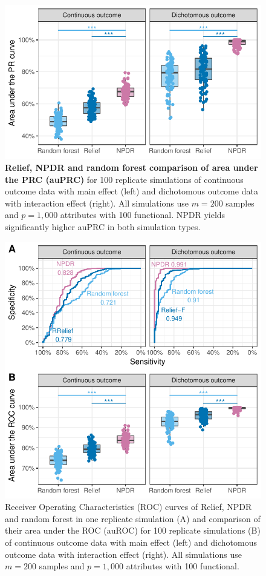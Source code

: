 \documentclass{article}
\begin{document}
\begin{figure}[h]%
\centerline{\includegraphics[]{../figs/pr_compare_100.pdf}}
\caption{\textbf{Relief, NPDR and random forest comparison of area under the PRC (auPRC)} for 100 replicate simulations of continuous outcome data with main effect (left) and dichotomous outcome data with interaction effect (right). All simulations use $m = 200$ samples and $p = 1,000$ attributes with 100 functional. NPDR yields significantly higher auPRC in both simulation types.}
\label{fig:auPRC}
\end{figure}

\begin{figure}[h]%
\centerline{\includegraphics[]{../figs/roc_compare_100.pdf}}
\caption{Receiver Operating Characteristics (ROC) curves of Relief, NPDR and random forest in one replicate simulation (A) and comparison of their area under the ROC (auROC) for 100 replicate simulations (B) of continuous outcome data with main effect (left) and dichotomous outcome data with interaction effect (right). All simulations use $m = 200$ samples and $p = 1,000$ attributes with 100 functional.}
\label{fig:auROC}
\end{figure}
\end{document}
